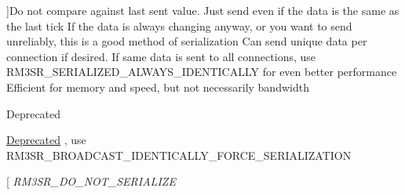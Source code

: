\begin{Desc}
\begin{description}
{}]Do not compare against last sent value. Just send even if the data is the same as the last tick If the data is always changing anyway, or you want to send unreliably, this is a good method of serialization Can send unique data per connection if desired. If same data is sent to all connections, use R\-M3\-S\-R\-\_\-\-S\-E\-R\-I\-A\-L\-I\-Z\-E\-D\-\_\-\-A\-L\-W\-A\-Y\-S\-\_\-\-I\-D\-E\-N\-T\-I\-C\-A\-L\-L\-Y for even better performance Efficient for memory and speed, but not necessarily bandwidth \item[{\em 
\hypertarget{group___r_e_p_l_i_c_a___m_a_n_a_g_e_r___g_r_o_u_p3_gga993da25eb23b67455e2438971c51429ca065bb061cfc67fc94c4ddc147cd9e525}{R\-M3\-S\-R\-\_\-\-S\-E\-R\-I\-A\-L\-I\-Z\-E\-D\-\_\-\-A\-L\-W\-A\-Y\-S\-\_\-\-I\-D\-E\-N\-T\-I\-C\-A\-L\-L\-Y}\label{group___r_e_p_l_i_c_a___m_a_n_a_g_e_r___g_r_o_u_p3_gga993da25eb23b67455e2438971c51429ca065bb061cfc67fc94c4ddc147cd9e525}
}]\begin{DoxyRefDesc}{Deprecated}
\item[\hyperlink{deprecated__deprecated000004}{Deprecated}], use R\-M3\-S\-R\-\_\-\-B\-R\-O\-A\-D\-C\-A\-S\-T\-\_\-\-I\-D\-E\-N\-T\-I\-C\-A\-L\-L\-Y\-\_\-\-F\-O\-R\-C\-E\-\_\-\-S\-E\-R\-I\-A\-L\-I\-Z\-A\-T\-I\-O\-N \end{DoxyRefDesc}
\item[{\em 
\hypertarget{group___r_e_p_l_i_c_a___m_a_n_a_g_e_r___g_r_o_u_p3_gga993da25eb23b67455e2438971c51429ca60f8e6fa13b204ae52d20844e00b2a36}{R\-M3\-S\-R\-\_\-\-D\-O\-\_\-\-N\-O\-T\-\_\-\-S\-E\-R\-I\-A\-L\-I\-Z\-E}\label{group___r_e_p_l_i_c_a___m_a_n_a_g_e_r___g_r_o_u_p3_gga993da25eb23b67455e2438971c51429ca60f8e6fa13b204ae52d20844e00b2a36}
}
\end{description}
\end{Desc}
